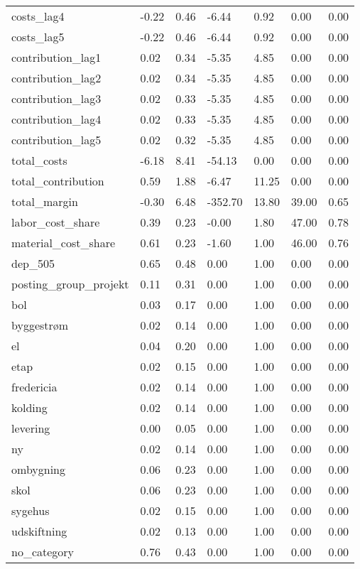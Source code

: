 \begin{landscape}
\begin{longtable}[h!]{lllllll}
costs_lag4 & -0.22 & 0.46 & -6.44 & 0.92 & 0.00 & 0.00 \\
costs_lag5 & -0.22 & 0.46 & -6.44 & 0.92 & 0.00 & 0.00 \\
contribution_lag1 & 0.02 & 0.34 & -5.35 & 4.85 & 0.00 & 0.00 \\
contribution_lag2 & 0.02 & 0.34 & -5.35 & 4.85 & 0.00 & 0.00 \\
contribution_lag3 & 0.02 & 0.33 & -5.35 & 4.85 & 0.00 & 0.00 \\
contribution_lag4 & 0.02 & 0.33 & -5.35 & 4.85 & 0.00 & 0.00 \\
contribution_lag5 & 0.02 & 0.32 & -5.35 & 4.85 & 0.00 & 0.00 \\
total_costs & -6.18 & 8.41 & -54.13 & 0.00 & 0.00 & 0.00 \\
total_contribution & 0.59 & 1.88 & -6.47 & 11.25 & 0.00 & 0.00 \\
total_margin & -0.30 & 6.48 & -352.70 & 13.80 & 39.00 & 0.65 \\
labor_cost_share & 0.39 & 0.23 & -0.00 & 1.80 & 47.00 & 0.78 \\
material_cost_share & 0.61 & 0.23 & -1.60 & 1.00 & 46.00 & 0.76 \\
dep_505 & 0.65 & 0.48 & 0.00 & 1.00 & 0.00 & 0.00 \\
posting_group_projekt & 0.11 & 0.31 & 0.00 & 1.00 & 0.00 & 0.00 \\
bol & 0.03 & 0.17 & 0.00 & 1.00 & 0.00 & 0.00 \\
byggestrøm & 0.02 & 0.14 & 0.00 & 1.00 & 0.00 & 0.00 \\
el & 0.04 & 0.20 & 0.00 & 1.00 & 0.00 & 0.00 \\
etap & 0.02 & 0.15 & 0.00 & 1.00 & 0.00 & 0.00 \\
fredericia & 0.02 & 0.14 & 0.00 & 1.00 & 0.00 & 0.00 \\
kolding & 0.02 & 0.14 & 0.00 & 1.00 & 0.00 & 0.00 \\
levering & 0.00 & 0.05 & 0.00 & 1.00 & 0.00 & 0.00 \\
ny & 0.02 & 0.14 & 0.00 & 1.00 & 0.00 & 0.00 \\
ombygning & 0.06 & 0.23 & 0.00 & 1.00 & 0.00 & 0.00 \\
skol & 0.06 & 0.23 & 0.00 & 1.00 & 0.00 & 0.00 \\
sygehus & 0.02 & 0.15 & 0.00 & 1.00 & 0.00 & 0.00 \\
udskiftning & 0.02 & 0.13 & 0.00 & 1.00 & 0.00 & 0.00 \\
no_category & 0.76 & 0.43 & 0.00 & 1.00 & 0.00 & 0.00 \\

\end{longtable}
\end{landscape}

